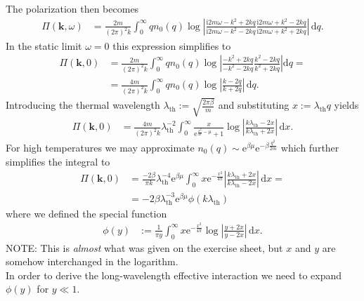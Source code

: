 \documentclass[english, parskip=full]{scrartcl}
\newcommand{\intx}{}
\renewcommand{\i}{\text{i}}
\newcommand{\e}{\text{e}}
\begin{document}
The polarization then becomes
\begin{align}
\Pi(\textbf{k},\omega) &= \frac{2m}{(2\pi)^2 k} \intx\int_{0}^{\infty} qn_0(q) \log \left\vert \frac{\i 2m\omega - k^2 + 2kq}{\i 2m\omega - k^2 - 2kq} \frac{\i 2m\omega + k^2 - 2kq}{\i 2m\omega + k^2 + 2kq} \right\vert \, \mathrm{d}q.
\end{align}
In the static limit $\omega = 0$ this expression simplifies to
\begin{align}
\Pi(\textbf{k},0) &= \frac{2m}{(2\pi)^2k} \intx\int_{0}^{\infty} qn_0(q) \log \left\vert \frac{-k^2 + 2kq}{-k^2 - 2kq} \frac{k^2 - 2kq}{k^2 + 2kq} \right\vert  \mathrm{d}q = \\
&= \frac{4m}{(2\pi)^2k} \intx\int_{0}^{\infty} qn_0(q) \log \left\vert \frac{k - 2q}{k + 2q} \right\vert \, \mathrm{d}q.
\end{align}
Introducing the thermal wavelength $\lambda_\mathrm{th} := \sqrt{\frac{2\pi \beta}{m}}$ and substituting $x := \lambda_\mathrm{th} q$ yields
\begin{align}
\Pi(\textbf{k},0) &= \frac{4m}{(2\pi)^2k} \lambda_\mathrm{th}^{-2} \intx\int_{0}^{\infty} \frac{x}{\e^{\frac{x^2}{4\pi} - \mu} + 1} \log \left\vert \frac{k\lambda_\mathrm{th} - 2x}{k\lambda_\mathrm{th} + 2x} \right\vert \, \mathrm{d}x.
\end{align}
For high temperatures we may approximate $n_0(q) \sim \e^{\beta\mu} \e^{-\beta \frac{q^2}{2m}}$ which further simplifies the integral to
\begin{align}
\Pi(\textbf{k},0) &= \frac{-2\beta}{\pi k} \lambda_\mathrm{th}^{-4} \e^{\beta\mu} \intx\int_{0}^{\infty}x \e^{-\frac{x^2}{4\pi}} \left\vert \frac{k\lambda_\mathrm{th} + 2x}{k\lambda_\mathrm{th} - 2x} \right\vert \, \mathrm{d}x = \\
&= -2\beta \lambda_\mathrm{th}^{-3} \e^{\beta\mu} \phi(k\lambda_\mathrm{th})
\end{align}
where we defined the special function
\begin{align}
\phi(y) &:= \frac{1}{\pi y} \intx\int_{0}^{\infty} x\e^{-\frac{x^2}{4\pi}} \log\left\vert \frac{y + 2x}{y - 2x} \right\vert \, \mathrm{d}x.
\end{align}
NOTE: This is \emph{almost} what was given on the exercise sheet, but $x$ and $y$ are somehow interchanged in the logarithm.\\
In order to derive the long-wavelength effective interaction we need to expand $\phi(y)$ for $y\ll 1$.
\end{document}
